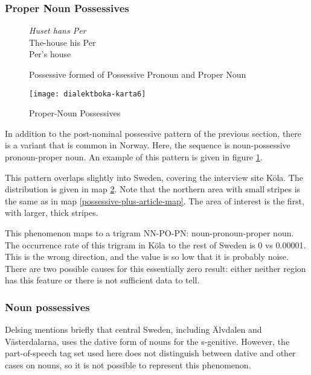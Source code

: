 

\subsubsection{Proper Noun Possessives}

\begin{figure}
  {\it Huset hans Per} \\
  The-house his Per \\
  Per's house
  \caption{Possessive formed of Possessive Pronoun and Proper Noun}
  \label{proper-noun-post-possessive}
\end{figure}

\begin{figure}
  \texttt{[image: dialektboka-karta6]}
  \caption{Proper-Noun Possessives}
  \label{proper-noun-post-possessive-map}
\end{figure}

In addition to the post-nominal possessive pattern of the previous
section, there is a variant that is common in Norway. Here, the
sequence is noun-possessive pronoun-proper noun. An example
of this pattern is given in figure \ref{proper-noun-post-possessive}.

This pattern overlaps slightly into Sweden, covering the interview
site K\"ola. The distribution is given in map
\ref{proper-noun-post-possessive-map}. Note that the northern area
with small stripes is the same as in map
\ref{possessive-plus-article-map}. The area of interest is the first,
with larger, thick stripes.

This phenomenon maps to a trigram NN-PO-PN: noun-pronoun-proper
noun. The occurrence rate of this trigram in K\"ola to the rest of
Sweden is 0 vs 0.00001. This is the wrong direction, and the value is
so low that it is probably noise. There are two possible causes for
this essentially zero result: either neither region has this feature
or there is not sufficient data to tell.

\subsubsection{Noun possessives}

Delsing mentions briefly that central Sweden, including \"Alvdalen and
V\"asterdalarna, uses the dative form of nouns for the
s-genitive. However, the part-of-speech tag set used here does not
distinguish between dative and other cases on nouns, so it is not
possible to represent this phenomenon.

